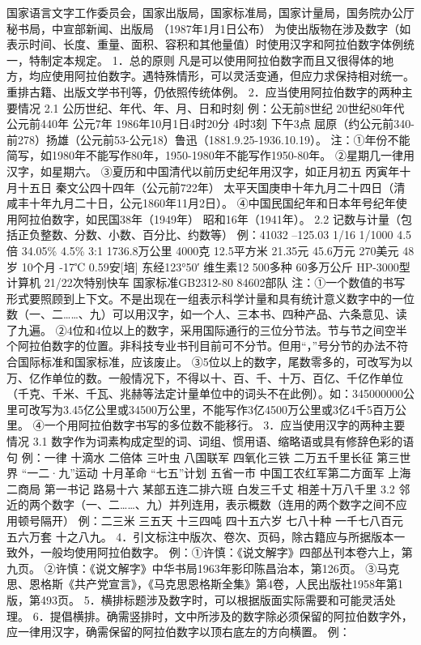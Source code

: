 国家语言文字工作委员会，国家出版局，国家标准局，国家计量局，国务院办公厅秘书局，中宣部新闻、出版局
（1987年1月1日公布）
为使出版物在涉及数字（如表示时间、长度、重量、面积、容积和其他量值）时使用汉字和阿拉伯数字体例统一，特制定本规定。
1．总的原则
凡是可以使用阿拉伯数字而且又很得体的地方，均应使用阿拉伯数字。遇特殊情形，可以灵活变通，但应力求保持相对统一。重排古籍、出版文学书刊等，仍依照传统体例。
2．应当使用阿拉伯数字的两种主要情况
2.1  公历世纪、年代、年、月、日和时刻
例：公无前8世纪  20世纪80年代  公元前440年  公元7年  1986年10月1日4时20分  4时3刻  下午3点  屈原（约公元前340-前278）扬雄（公元前53-公元18）鲁迅（1881.9.25-1936.10.19）。
注：①年份不能简写，如1980年不能写作80年，1950-1980年不能写作1950-80年。
②星期几一律用汉字，如星期六。
③夏历和中国清代以前历史纪年用汉字，如正月初五  丙寅年十月十五日  秦文公四十四年（公元前722年）  太平天国庚申十年九月二十四日（清咸丰十年九月二十日，公元1860年11月2日）。
④中国民国纪年和日本年号纪年使用阿拉伯数字，如民国38年（1949年）  昭和16年（1941年）。
2.2  记数与计量（包括正负整数、分数、小数、百分比、约数等）
例：41032 –125.03  1/16  1/1000  4.5倍  34.05\%  4.5\%  3:1  1736.8万公里  4000克  12.5平方米  21.35元  45.6万元  270美元  48岁  10个月  -17℃  0.59安[培]  东经123°50′  维生素12  500多种  60多万公斤  HP-3000型计算机  21/22次特别快车  国家标准GB2312-80  84602部队
注：①一个数值的书写形式要照顾到上下文。不是出现在一组表示科学计量和具有统计意义数字中的一位数（一、二……、九）可以用汉字，如一个人、三本书、四种产品、六条意见、读了九遍。
②4位和4位以上的数字，采用国际通行的三位分节法。节与节之间空半个阿拉伯数字的位置。非科技专业书刊目前可不分节。但用“，”号分节的办法不符合国际标准和国家标准，应该废止。
③5位以上的数字，尾数零多的，可改写为以万、亿作单位的数。一般情况下，不得以十、百、千、十万、百亿、千亿作单位（千克、千米、千瓦、兆赫等法定计量单位中的词头不在此例）。如：345000000公里可改写为3.45亿公里或34500万公里，不能写作3亿4500万公里或3亿4千5百万公里。
④一个用阿拉伯数字书写的多位数不能移行。
3．应当使用汉字的两种主要情况
3.1  数字作为词素构成定型的词、词组、惯用语、缩略语或具有修辞色彩的语句
例：一律  十滴水  二倍体  三叶虫  八国联军  四氧化三铁  二万五千里长征  第三世界  “一二·九”运动  十月革命  “七五”计划  五省一市  中国工农红军第二方面军  上海二商局 第一书记  路易十六  某部五连二排六班  白发三千丈  相差十万八千里
3.2  邻近的两个数字（一、二……、九）并列连用，表示概数（连用的两个数字之间不应用顿号隔开）
例：二三米  三五天  十三四吨  四十五六岁  七八十种  一千七八百元  五六万套  十之八九。
4．引文标注中版次、卷次、页码，除古籍应与所据版本一致外，一般均使用阿拉伯数字。
例：①许慎：《说文解字》四部丛刊本卷六上，第九页。
②许慎：《说文解字》中华书局1963年影印陈昌治本，第126页。
③马克思、恩格斯《共产党宣言》，《马克思恩格斯全集》第4卷，人民出版社1958年第1版，第493页。
5．横排标题涉及数字时，可以根据版面实际需要和可能灵活处理。
6．提倡横排。确需竖排时，文中所涉及的数字除必须保留的阿拉伯数字外，应一律用汉字，确需保留的阿拉伯数字以顶右底左的方向横置。
例：

